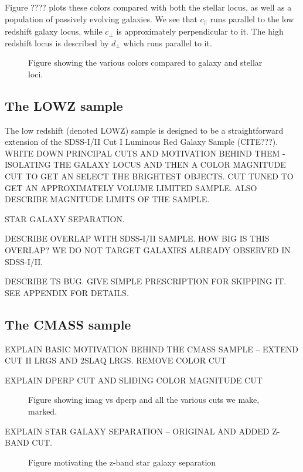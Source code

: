 \documentclass[preprint]{aastex}
\newcommand{\cpp}{c_{\perp}}
\newcommand{\cll}{c_{||}}
\newcommand{\dpp}{d_{\perp}}
\begin{document}
Figure ???? plots these colors compared with both the stellar locus,
as well as a population of passively evolving galaxies. We see that $\cll$ runs
parallel to the low redshift galaxy locus, while $\cpp$ is approximately
perpendicular to it. The high redshift locus is described by $\dpp$ which runs
parallel to it. 

\begin{figure}
\caption{Figure showing the various colors compared to galaxy and stellar loci.}
\label{fig:color}
\end{figure}

\subsection{The LOWZ sample}

The low redshift (denoted LOWZ) sample is designed to be a straightforward
extension of the SDSS-I/II Cut I Luminous Red Galaxy Sample (CITE???).
WRITE DOWN PRINCIPAL CUTS AND MOTIVATION BEHIND THEM - ISOLATING THE GALAXY
LOCUS AND THEN A COLOR MAGNITUDE CUT TO GET AN SELECT THE BRIGHTEST OBJECTS. 
CUT TUNED TO GET AN APPROXIMATELY VOLUME LIMITED SAMPLE. ALSO DESCRIBE MAGNITUDE
LIMITS OF THE SAMPLE.

STAR GALAXY SEPARATION.

DESCRIBE OVERLAP WITH SDSS-I/II SAMPLE. HOW BIG IS THIS OVERLAP? WE DO NOT
TARGET GALAXIES ALREADY OBSERVED IN SDSS-I/II.

DESCRIBE TS BUG. GIVE SIMPLE PRESCRIPTION FOR SKIPPING IT. SEE APPENDIX FOR
DETAILS.

\subsection{The CMASS sample}

EXPLAIN BASIC MOTIVATION BEHIND THE CMASS SAMPLE -- EXTEND CUT II LRGS AND 2SLAQ
LRGS. REMOVE COLOR CUT

EXPLAIN DPERP CUT AND SLIDING COLOR MAGNITUDE CUT

\begin{figure}
\caption{Figure showing imag vs dperp and all the various cuts we make, marked.}
\end{figure}

EXPLAIN STAR GALAXY SEPARATION -- ORIGINAL AND ADDED Z-BAND CUT.

\begin{figure}
\caption{Figure motivating the z-band star galaxy separation}
\end{figure}
\end{document}
